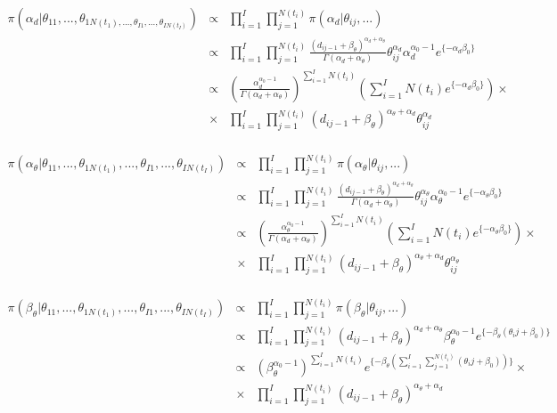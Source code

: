 \begin{eqnarray*}
\pi(\alpha_d|\theta_{11},...,\theta_{1N(t_1),...,\theta_{I1},...,\theta_{IN(t_I)}})&\propto & \prod_{i=1}^I \prod_{j=1}^{N(t_i)} \pi(\alpha_d|\theta_{ij},...)\\
&\propto & \prod_{i=1}^I \prod_{j=1}^{N(t_i)} \frac{(d_{ij-1}+\beta_\theta)^{\alpha_d+\alpha_\theta}}{\Gamma(\alpha_d+\alpha_\theta)} \theta_{ij}^{\alpha_d}\alpha_d^{\alpha_0-1}e^{\{-\alpha_d\beta_0\}}\\
&\propto & (\frac{\alpha_d^{\alpha_0 -1}}{\Gamma(\alpha_d+\alpha_\theta)})^{\sum_{i=1}^I N(t_i)} (\sum_{i=1}^I N(t_i) e^{\{-\alpha_d\beta_0\}}) \times \\
&\times & \prod_{i=1}^I \prod_{j=1}^{N(t_i)} (d_{ij-1}+\beta_\theta)^{\alpha_\theta+\alpha_d} \theta_{ij}^{\alpha_d}
\end{eqnarray*}
\\
\begin{eqnarray*}
\pi(\alpha_\theta|\theta_{11},...,\theta_{1N(t_1)},...,\theta_{I1},...,\theta_{IN(t_I)})&\propto & \prod_{i=1}^I \prod_{j=1}^{N(t_i)} \pi(\alpha_\theta|\theta_{ij},...)\\
&\propto &\prod_{i=1}^I \prod_{j=1}^{N(t_i)} \frac{(d_{ij-1}+\beta_\theta)^{\alpha_d+\alpha_\theta}}{\Gamma(\alpha_d+\alpha_\theta)} \theta_{ij}^{\alpha_\theta}\alpha_\theta^{\alpha_0-1}e^{\{-\alpha_\theta\beta_0\}}\\
&\propto & (\frac{\alpha_\theta^{\alpha_0 -1}}{\Gamma(\alpha_d+\alpha_\theta)})^{\sum_{i=1}^I N(t_i)} (\sum_{i=1}^I N(t_i) e^{\{-\alpha_\theta\beta_0\}}) \times \\
&\times & \prod_{i=1}^I \prod_{j=1}^{N(t_i)} (d_{ij-1}+\beta_\theta)^{\alpha_\theta+\alpha_d} \theta_{ij}^{\alpha_\theta}
\end{eqnarray*}
\\
\begin{eqnarray*}
\pi(\beta_\theta|\theta_{11},...,\theta_{1N(t_1)},...,\theta_{I1},...,\theta_{IN(t_I)})&\propto & \prod_{i=1}^I \prod_{j=1}^{N(t_i)} \pi(\beta_\theta|\theta_{ij},...)\\
&\propto &\prod_{i=1}^I \prod_{j=1}^{N(t_i)} (d_{ij-1}+\beta_\theta)^{\alpha_d+\alpha_\theta}\beta_\theta^{\alpha_0-1} e^{\{-\beta_\theta(\theta_ij+\beta_0)\}}\\
&\propto & (\beta_\theta^{\alpha_0-1})^{\sum_{i=1}^I N(t_i)} e^{\{-\beta_\theta(\sum_{i=1}^I \sum_{j=1}^{N(t_i)}(\theta_ij+\beta_0))\}} \times \\
&\times & \prod_{i=1}^I \prod_{j=1}^{N(t_i)} (d_{ij-1}+\beta_\theta)^{\alpha_\theta+\alpha_d}
\end{eqnarray*}
